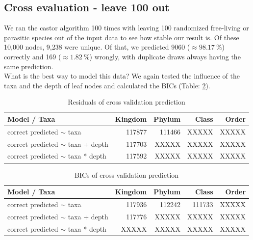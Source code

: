     \subsection{Cross evaluation - leave 100 out}
      We ran the castor algorithm 100 times with leaving 100 randomized free-living or parasitic species 
        out of the input data to see how stable our result is. Of these 10,000 nodes, 9,238 were unique. 
        Of that, we predicted 9060 ($\approx 98.17~\%$) correctly and 169 ($\approx 1.82~\%$) wrongly, 
        with duplicate draws always having the same prediction. \\
      What is the best way to model this data? We again tested the influence of the taxa and the depth 
        of leaf nodes and calculated the BICs (Table: \ref{table:BIC cross validation}).

      \begin{table}[h]
        \begin{center}
          \begin{tabular}{ |l|r|r|r|r| }
            \hline
            Model / Taxa & Kingdom & Phylum & Class & Order \\
            \hline \hline
            correct predicted $\sim$ taxa & 117877 & 111466 & XXXXX & XXXXX \\
            \hline
            correct predicted $\sim$ taxa + depth & 117703 & XXXXX & XXXXX & XXXXX \\
            \hline
            correct predicted $\sim$ taxa * depth & 117592 & XXXXX & XXXXX & \cellcolor{green!60}XXXXX \\
            \hline
          \end{tabular} 
        \end{center}
        \caption{Residuals of cross validation prediction}
        \label{table:Residuals cross validation} 
      \end{table}

      \begin{table}[h]
        \begin{center}
          \begin{tabular}{ |l|r|r|r|r| }
            \hline
            Model / Taxa & Kingdom & Phylum & Class & Order \\
            \hline \hline
            correct predicted $\sim$ taxa & 117936 & 112242 & 111733 & XXXXX \\
            \hline
            correct predicted $\sim$ taxa + depth & 117776 & XXXXX & XXXXX & XXXXX \\
            \hline
            correct predicted $\sim$ taxa * depth & XXXXX & XXXXX & XXXXX & \cellcolor{green!60}XXXXX \\
            \hline
          \end{tabular} 
        \end{center}
        \caption{BICs of cross validation prediction}
        \label{table:BIC cross validation} 
      \end{table}

